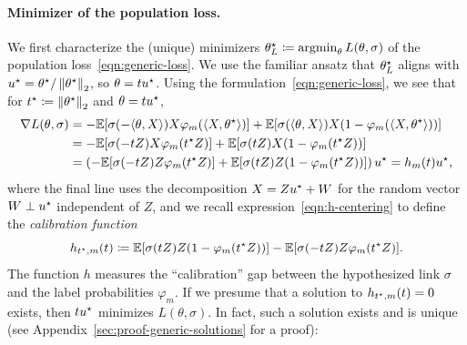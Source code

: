 \paragraph{Minimizer of the population loss.}
We first characterize the (unique)
minimizers $\theta^\star_L
\coloneqq \operatorname*{argmin}_\theta L(\theta, \sigma)$ of the population
loss~\eqref{eqn:generic-loss}.
%
We use the familiar ansatz that $\theta^\star_L$ aligns with $u^\star =
\theta^\star / \left\|{\theta^\star}\right\|_2$, so $\theta = t u^\star$.
%
Using the
formulation~\eqref{eqn:generic-loss}, we see that for $t^\star \coloneqq
\left\|{\theta^\star}\right\|_2$ and $\theta = t u^\star$,
\begin{align}
	\nabla L(\theta, \sigma) &
	= -\mathbb{E}[\sigma(-\langle\theta, X\rangle) X
	\varphi_m(\langle X, \theta^\star\rangle)]
	+ \mathbb{E}[\sigma(\langle\theta, X\rangle) X (1 - \varphi_m(\langle X, \theta^\star\rangle))]
	\nonumber \\
	& = -\mathbb{E}[\sigma(- t Z) X \varphi_m(t^\star   Z)]
	+  \mathbb{E}[\sigma(tZ) X (1 - \varphi_m(t^\star Z))] \nonumber \\
	& = \left(-\mathbb{E}[\sigma(- tZ) Z \varphi_m(t^\star Z)] 
	+ \mathbb{E}[\sigma(tZ) Z (1 - \varphi_m(t^\star Z))] \right) u^\star
	= h_m(t) u^\star, \label{eqn:generic-gradient}
\end{align}
where the final line uses the decomposition $X = Z u^\star + W$ for the random
vector $W \perp u^\star$ independent of $Z$, and we recall
expression~\eqref{eqn:h-centering} to define the
\emph{calibration function}
\begin{equation}
  \label{eqn:h-m-func}
  h_{t^\star, m}(t) \coloneqq \mathbb{E}[\sigma(tZ) Z (1 - \varphi_m(t^\star Z))]
  - \mathbb{E}[\sigma(-t Z) Z \varphi_m(t^\star Z)].
\end{equation}
The function $h$ measures the ``calibration'' gap between the
hypothesized link $\sigma$ and the label probabilities
$\varphi_m$. %
If we presume that a solution to $h_{t^\star,m}(t) = 0$ exists, then
$t u^\star$ minimizes $L(\theta, \sigma)$. In fact,
such a solution exists and is unique
(see Appendix~\ref{sec:proof-generic-solutions} for a proof):

\newcommand{\Hessian}{H_L}  %
\newcommand{\hessfunc}{\mathsf{he}}  %
\newcommand{\linkerr}{\mathsf{le}}  %
\newcommand{\varfunc}{C_m}  %


